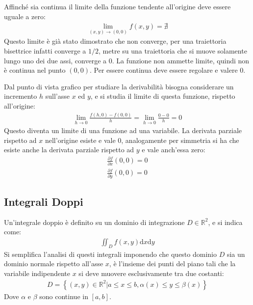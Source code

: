 \documentclass{article}
\newcommand{\df}{\mathrm{d}}
\numberwithin{equation}{subsection}
\begin{document}
Affinché sia continua il limite della funzione tendente all'origine deve essere uguale a zero:
\begin{gather*}
    \lim_{(x,y)\to(0,0)}f(x,y)=\nexists
\end{gather*}
Questo limite è già stato dimostrato che non converge, per una traiettoria bisettrice infatti converge a $1/2$, metre su una traiettoria che si muove solamente lungo uno dei due assi, converge a $0$. La funzione non ammette limite, quindi non è continua nel punto $(0,0)$. Per essere continua deve essere regolare e valere $0$. 


Dal punto di vista grafico per studiare la derivabilità bisogna considerare un incremento $h$ sull'asse $x$ ed $y$, e si studia il limite di questa funzione, rispetto all'origine:
\begin{gather*}
    \lim_{h\to0}\displaystyle\frac{f(h,0)-f(0,0)}{h}=\lim_{h\to0}\frac{0-0}{h}=0
\end{gather*}
Questo diventa un limite di una funzione ad una variabile. La derivata parziale rispetto ad $x$ nell'origine esiste e vale $0$, analogamente per simmetria si ha che esiste anche la derivata parziale rispetto ad $y$ e vale anch'essa zero:
\begin{gather*}
    \displaystyle\frac{\partial f}{\partial x}(0,0)=0\\
    \displaystyle\frac{\partial f}{\partial y}(0,0)=0
\end{gather*}

\subsection{Integrali Doppi}

Un'integrale doppio è definito su un dominio di integrazione $D\in\mathbb{R}^2$, e si indica come:
\begin{gather*}
    \iint_Df(x,y)\df x\df y
\end{gather*}
Si semplifica l'analisi di questi integrali imponendo che questo dominio $D$ sia un dominio normale rispetto all'asse $x$, è l'insieme dei punti del piano tali che la variabile indipendente $x$ si deve muovere esclusivamente tra due costanti:
\begin{gather*}
    D=\left\{(x,y)\in\mathbb{R}^2\bigg|a\leq x\leq b,\alpha(x)\leq y\leq\beta(x)\right\}
\end{gather*}
Dove $\alpha$ e $\beta$ sono continue in $[a,b]$. 

\end{document}
